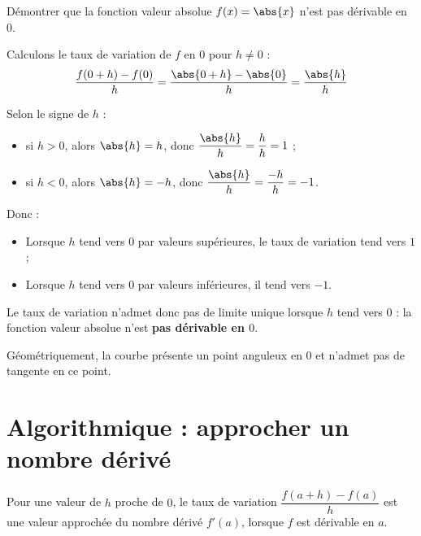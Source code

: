 \begin{methode}
	Démontrer que la fonction valeur absolue $f(x) = \abs{x}$ n'est pas dérivable en $0$.

	\begin{correction}
		Calculons le taux de variation de $f$ en $0$ pour $h \neq 0$ :
		\[
			\dfrac{f(0 + h) - f(0)}{h} = \dfrac{\abs{0 + h} - \abs{0}}{h} = \dfrac{\abs{h}}{h}
		\]

		Selon le signe de $h$ :
		\begin{itemize}
			\item si $h > 0$, alors $\abs{h} = h$, donc $\dfrac{\abs{h}}{h} = \dfrac{h}{h} = 1$ ;
			\item si $h < 0$, alors $\abs{h} = -h$, donc $\dfrac{\abs{h}}{h} = \dfrac{-h}{h} = -1$.
		\end{itemize}

		Donc :
		\begin{itemize}
			\item Lorsque $h$ tend vers $0$ par valeurs supérieures, le taux de variation tend vers $1$;
			\item Lorsque $h$ tend vers $0$ par valeurs inférieures, il tend vers $-1$.
		\end{itemize}

		Le taux de variation n'admet donc pas de limite unique lorsque $h$ tend vers $0$ : la fonction valeur absolue n'est \textbf{pas dérivable en $0$}.

		Géométriquement, la courbe présente un point anguleux en $0$ et n'admet pas de tangente en ce point.
	\end{correction}
\end{methode}

\newpage

\section{Algorithmique : approcher un nombre dérivé}

Pour une valeur de $h$ proche de $0$, le taux de variation $\dfrac{f(a + h) - f(a)}{h}$ est une valeur approchée du nombre dérivé $f'(a)$, lorsque $f$ est dérivable en $a$.

